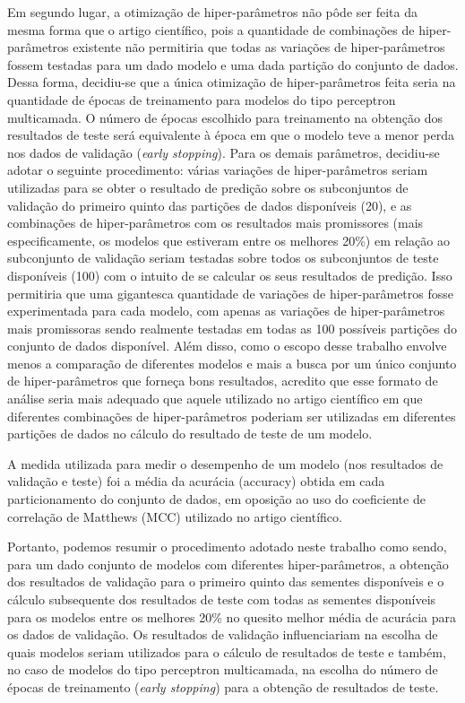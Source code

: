 Em segundo lugar, a otimização de hiper-parâmetros não pôde ser feita da mesma forma que o artigo científico, pois a quantidade de combinações de hiper-parâmetros existente não permitiria que todas as variações de hiper-parâmetros fossem testadas para um dado modelo e uma dada partição do conjunto de dados. Dessa forma, decidiu-se que a única otimização de hiper-parâmetros feita seria na quantidade de épocas de treinamento para modelos do tipo perceptron multicamada. O número de épocas escolhido para treinamento na obtenção dos resultados de teste será equivalente à época em que o modelo teve a menor perda nos dados de validação (\textit{early stopping}). Para os demais parâmetros, decidiu-se adotar o seguinte procedimento: várias variações de hiper-parâmetros seriam utilizadas para se obter o resultado de predição sobre os subconjuntos de validação do primeiro quinto das partições de dados disponíveis (20), e as combinações de hiper-parâmetros com os resultados mais promissores (mais especificamente, os modelos que estiveram entre os melhores 20\%) em relação ao subconjunto de validação seriam testadas sobre todos os subconjuntos de teste disponíveis (100) com o intuito de se calcular os seus resultados de predição. Isso permitiria que uma gigantesca quantidade de variações de hiper-parâmetros fosse experimentada para cada modelo, com apenas as variações de hiper-parâmetros mais promissoras sendo realmente testadas em todas as 100 possíveis partições do conjunto de dados disponível. Além disso, como o escopo desse trabalho envolve menos a comparação de diferentes modelos e mais a busca por um único conjunto de hiper-parâmetros que forneça bons resultados, acredito que esse formato de análise seria mais adequado que aquele utilizado no artigo científico em que diferentes combinações de hiper-parâmetros poderiam ser utilizadas em diferentes partições de dados no cálculo do resultado de teste de um modelo.

A medida utilizada para medir o desempenho de um modelo (nos resultados de validação e teste) foi a média da acurácia (accuracy) obtida em cada particionamento do conjunto de dados, em oposição ao uso do coeficiente de correlação de Matthews (MCC) utilizado no artigo científico.

Portanto, podemos resumir o procedimento adotado neste trabalho como sendo, para um dado conjunto de modelos com diferentes hiper-parâmetros, a obtenção dos resultados de validação para o primeiro quinto das sementes disponíveis e o cálculo subsequente dos resultados de teste com todas as sementes disponíveis para os modelos entre os melhores 20\% no quesito melhor média de acurácia para os dados de validação. Os resultados de validação influenciariam na escolha de quais modelos seriam utilizados para o cálculo de resultados de teste e também, no caso de modelos do tipo perceptron multicamada, na escolha do número de épocas de treinamento (\textit{early stopping}) para a obtenção de resultados de teste.

